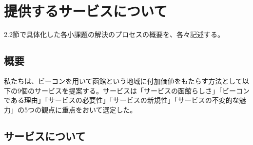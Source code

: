 \chapter{提供するサービスについて}
2.2節で具体化した各小課題の解決のプロセスの概要を、各々記述する。
\section{概要}
私たちは、ビーコンを用いて函館という地域に付加価値をもたらす方法として以下の9個のサービスを提案する。サービスは「サービスの函館らしさ」「ビーコンである理由」「サービスの必要性」「サービスの新規性」「サービスの不変的な魅力」の5つの観点に重点をおいて選定した。
\section{サービスについて}
